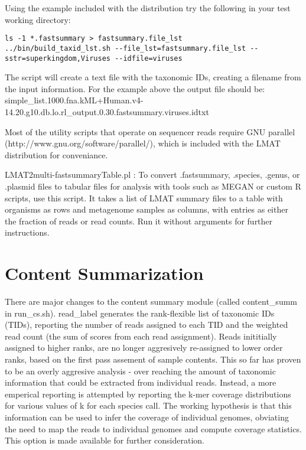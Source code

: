 \documentclass[11pt]{article}
\begin{document}
Using the example included with the distribution try the following in your test working directory:
\begin{verbatim}
ls -1 *.fastsummary > fastsummary.file_lst
../bin/build_taxid_lst.sh --file_lst=fastsummary.file_lst --sstr=superkingdom,Viruses --idfile=viruses
\end{verbatim}

The script will create a text file with the taxonomic IDs, creating a filename from the input information. For the example above the output file should be:
simple_list.1000.fna.kML+Human.v4-14.20.g10.db.lo.rl_output.0.30.fastsummary.viruses.idtxt




Most of the utility scripts that operate on sequencer reads require
GNU parallel (http://www.gnu.org/software/parallel/), which is included with the LMAT distribution for conveniance.



LMAT2multi-fastsummaryTable.pl : To convert .fastsummary, .species,
 .genus, or .plasmid files to tabular files for analysis with tools
 such as MEGAN or custom R scripts, use this script. It takes a list
 of LMAT summary files to a table with organisms as rows and
 metagenome samples as columns, with entries as either the fraction of
 reads or read counts. Run it without arguments for further
 instructions.


\section{Content Summarization}
There are major changes to the content summary module (called {content_summ} in
 {run\_cs.sh}).  {read\_label} generates the rank-flexible list of
 taxonomic IDs (TIDs), reporting the number of reads assigned to each
 TID and the weighted read count (the sum of scores from each read
 assignment). Reads inititially assigned to higher ranks, are no longer
aggresively re-assigned to lower order ranks, based on the first pass
assement of sample contents. This so far has proven to be an overly aggresive
analysis - over reaching the amount of taxonomic information that could be extracted from
individual reads. Instead, a more emperical reporting is attempted by reporting the
k-mer coverage distributions for various values of k for each species call.  The working
hypothesis is that this information can be used to infer the coverage of individual genomes,
obviating the need to map the reads to individual genomes and compute coverage statistics.
This option is made available for further consideration.
\end{document}
